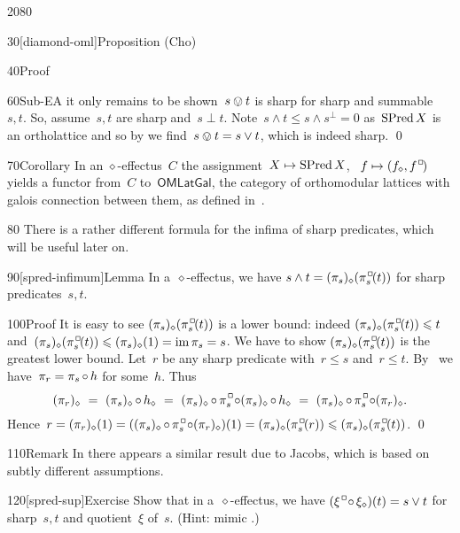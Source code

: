 \begin{parsec}{2080}
\begin{point}{30}[diamond-oml]{Proposition (Cho)}
\begin{point}{40}{Proof}
\begin{point}{60}{Sub-EA}
    it only remains to be shown~$s \ovee t$ is sharp
        for sharp and summable~$s,t$.
So, assume~$s,t$ are sharp and~$s \perp t$.
Note~$s \wedge t \leq s \wedge s^\perp =0$ as~$\operatorname{SPred} X$ is an ortholattice
    and so by 
    we find~$s \ovee t = s \vee t$, which is indeed sharp. \qed
\end{point}
\end{point}
\begin{point}{70}{Corollary}%
In an $\diamond$-effectus~$C$
the assignment~$X\mapsto \operatorname{SPred} X$, ~$f \mapsto (f_\diamond,f^\BOX)$
    yields a functor from~$C$
    to~$\mathsf{OMLatGal}$,
    the category of orthomodular lattices
    with galois connection between them,
    as defined in~\cite{jacobs2009orthomodular}.
\end{point}
\begin{point}{80}%
    There is a rather different
    formula for the infima of sharp predicates,
    which will be useful later on.
\end{point}
\end{point}
\begin{point}{90}[spred-infimum]{Lemma}%
In a~$\diamond$-effectus, we have
$s \wedge t = (\pi_s)_\diamond (\pi_s^\BOX (t))$
    for sharp predicates~$s,t$.
\begin{point}{100}{Proof}%
It is easy to see
$(\pi_s)_\diamond (\pi_s^\BOX (t))$ is a lower bound:
indeed
$(\pi_s)_\diamond (\pi_s^\BOX (t)) \leq t$
and~$(\pi_s)_\diamond (\pi_s^\BOX (t)) \leq (\pi_s)_\diamond(1)
    = \IM \pi_s = s$.
We have to show $(\pi_s)_\diamond (\pi_s^\BOX (t))$ is the greatest lower bound.
Let~$r$ be any sharp predicate with~$r \leq s$ and~$r \leq t$.
By~
    we have~$\pi_r = \pi_s \mathop{\circ} h$ for some~$h$.
Thus
\begin{equation*}
    (\pi_r)_\diamond
        \ = \  (\pi_s)_\diamond \after h_\diamond
        \ =\  (\pi_s)_\diamond \after \pi_s^\BOX  
            \after (\pi_s)_\diamond \after h_\diamond
        \ =\  (\pi_s)_\diamond \after \pi_s^\BOX \after (\pi_r)_\diamond.
\end{equation*}
Hence~$r = (\pi_r)_\diamond(1)  
=((\pi_s)_\diamond \after \pi_s^\BOX \after (\pi_r)_\diamond )(1)
=  (\pi_s)_\diamond ( \pi_s^\BOX (r))
\leq  (\pi_s)_\diamond ( \pi_s^\BOX (t))$. \qed
\end{point}
\begin{point}{110}{Remark}%
In \cite{effintro} there appears a similar result due to Jacobs,
    which is based on subtly different assumptions.
\end{point}
\end{point}
\begin{point}{120}[spred-sup]{Exercise}%
Show that in a~$\diamond$-effectus,
we have
        $(\xi^\BOX \after \xi_\diamond )(t) = s \vee t$
    for sharp~$s,t$ and  quotient~$\xi$ of~$s$.
    (Hint: mimic .)
\end{point}
\end{parsec}


